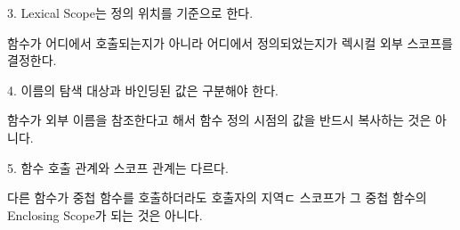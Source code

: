 \begin{dhknote}
\begin{dhksmry}[centered]
3. Lexical Scope는 정의 위치를 기준으로 한다.
\end{dhksmry}
\end{dhknote}

함수가 어디에서 호출되는지가 아니라 어디에서 정의되었는지가 렉시컬 외부 스코프를 결정한다.

\begin{dhknote}
\begin{dhksmry}[centered]
4. 이름의 탐색 대상과 바인딩된 값은 구분해야 한다.
\end{dhksmry}
\end{dhknote}

함수가 외부 이름을 참조한다고 해서 함수 정의 시점의 값을 반드시 복사하는 것은 아니다.

\begin{dhknote}
\begin{dhksmry}[centered]
5. 함수 호출 관계와 스코프 관계는 다르다.
\end{dhksmry}
\end{dhknote}

다른 함수가 중첩 함수를 호출하더라도 호출자의 지역ㄷ 스코프가 그 중첩 함수의 Enclosing Scope가 되는 것은 아니다.
